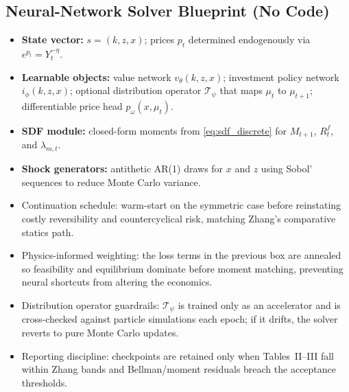 \documentclass[11pt,a4paper]{article}
\numberwithin{equation}{section}
\begin{document}
\subsection{Neural-Network Solver Blueprint (No Code)}
\begin{assumptionbox}[title={State, Networks, and Shock Simulation}]
\begin{itemize}
  \item \textbf{State vector:} \(s = (k, z, x)\); prices \(p_t\) determined endogenously via \(e^{p_t} = Y_t^{-\eta}\).
  \item \textbf{Learnable objects:} value network \(v_{\theta}(k, z, x)\); investment policy network \(i_{\phi}(k, z, x)\); optional distribution operator $\mathcal T_{\psi}$ that maps \(\mu_t\) to \(\mu_{t+1}\); differentiable price head \(p_{\omega}(x, \mu_t)\).
  \item \textbf{SDF module:} closed-form moments from \eqref{eq:sdf_discrete} for \(M_{t+1}\), \(R_t^f\), and \(\lambda_{m,t}\).
  \item \textbf{Shock generators:} antithetic AR(1) draws for \(x\) and \(z\) using Sobol' sequences to reduce Monte Carlo variance.
\end{itemize}
\end{assumptionbox}
\begin{notebox}[title={Modern Solver Upgrades (Economics-Preserving)}]
\begin{itemize}
  \item Continuation schedule: warm-start on the symmetric case before reinstating costly reversibility and countercyclical risk, matching Zhang's comparative statics path.
  \item Physics-informed weighting: the loss terms in the previous box are annealed so feasibility and equilibrium dominate before moment matching, preventing neural shortcuts from altering the economics.
  \item Distribution operator guardrails: $\mathcal T_{\psi}$ is trained only as an accelerator and is cross-checked against particle simulations each epoch; if it drifts, the solver reverts to pure Monte Carlo updates.
  \item Reporting discipline: checkpoints are retained only when Tables~II--III fall within Zhang bands and Bellman/moment residuals breach the acceptance thresholds.
\end{itemize}
\end{notebox}
\end{document}
